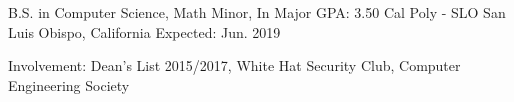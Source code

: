 


\begin{cventries}


\cventry
{B.S. in Computer Science, Math Minor, In Major GPA: 3.50} %
{Cal Poly - SLO} %
{San Luis Obispo, California} %
{Expected: Jun. 2019} %
{ %
\begin{cvitems}
\item {Involvement: Dean's List 2015/2017, White Hat Security Club, Computer Engineering Society }
\end{cvitems}
}


\end{cventries}
